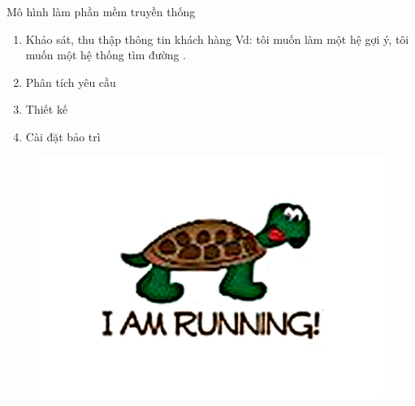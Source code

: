 \documentclass{beamer}
\begin{document}
\begin{frame}{Mô hình làm phần mềm truyền thống}
\begin{enumerate}
\item Khảo sát, thu thập thông tin khách hàng Vd: tôi muốn làm một hệ gợi ý, tôi muốn một hệ thống tìm đường .
\item Phân tích yêu cầu 
\item Thiết kế 
\item Cài đặt bảo trì 
\end{enumerate}
\begin{figure}
\begin{center}
\includegraphics[scale=0.5]{3.jpg}
\end{center}

\end{figure}
\end{frame}
\end{document}
